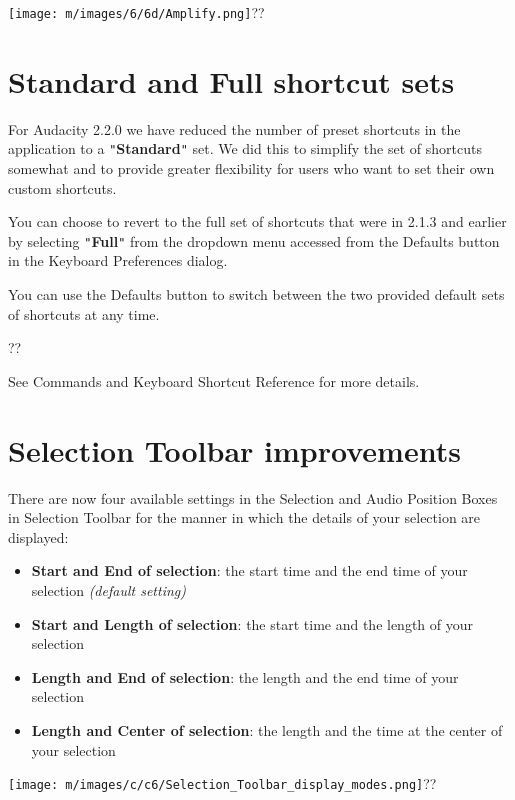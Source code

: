 
\texttt{[image: m/images/6/6d/Amplify.png]}??


\section{Standard and Full shortcut sets}


For Audacity 2.2.0 we have reduced the number of preset shortcuts in the application to a \texttt{{}"{}}\textbf{Standard}\texttt{{}"{}} set.  We did this to simplify the set of shortcuts somewhat and to provide greater flexibility for users who want to set their own custom shortcuts.

You can choose to revert to the full set of shortcuts that were in 2.1.3 and earlier by selecting \texttt{{}"{}}\textbf{Full}\texttt{{}"{}} from the dropdown menu accessed from the Defaults button in the Keyboard Preferences dialog.

You can use the Defaults button to switch between the two provided default sets of shortcuts at any time.



??

See Commands and Keyboard Shortcut Reference for more details.


\section{Selection Toolbar improvements}


There are now four available settings in the Selection and Audio Position Boxes in Selection Toolbar for the  manner in which the details of your selection are displayed:
\begin{itemize}
\item \textbf{Start and End of selection}: the start time and the end time of your selection \textit{(default setting)}
\item \textbf{Start and Length of selection}: the start time and the length of your selection
\item \textbf{Length and End of selection}: the length and the end time of your selection
\item \textbf{Length and Center of selection}: the length and the time at the center of your selection
\end{itemize}
\texttt{[image: m/images/c/c6/Selection\_Toolbar\_display\_modes.png]}??

